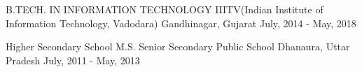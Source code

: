 \begin{cventries}
  \cventry
    {B.TECH. IN INFORMATION TECHNOLOGY}
    {IIITV(Indian Institute of Information Technology, Vadodara)}
    {Gandhinagar, Gujarat}
    {July, 2014 - May, 2018}
    {}
    {}
\end{cventries}

\begin{cventries}
  \cventry
    {Higher Secondary School}
    {M.S. Senior Secondary Public School}
    {Dhanaura, Uttar Pradesh}
    {July, 2011 - May, 2013}
    {}
    {}
\end{cventries}
